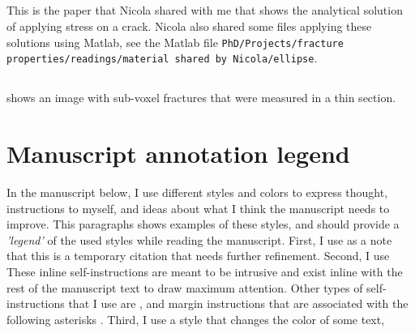 \documentclass[12pt,titlepage]{article}
\begin{document}
\subsection[Maugis (1992)]{\cite{Maugis1992}}
This is the paper that Nicola shared with me that shows the analytical solution of applying stress on a crack. Nicola also shared some files applying these solutions using Matlab, see the Matlab file \texttt{PhD/Projects/fracture properties/readings/material shared by Nicola/ellipse}.
 
\subsection[Ketcham and Carlson (2001)]{\cite{Ketcham2001}} 
\cite[fig. 6]{Ketcham2001} shows an image with sub-voxel fractures that were measured in a thin section.
\clearpage
\newpage



\pagebreak
\appendix
{}
\section*{Manuscript annotation legend}
In the manuscript below, I use different styles and colors to express thought, instructions to myself, and ideas about what I think the manuscript needs to improve. This paragraphs shows examples of these styles, and should provide a \emph{'legend'} of the used styles while reading the manuscript. First, I use  as a note that this is a temporary citation that needs further refinement. Second, I use  These inline self-instructions are meant to be intrusive and exist inline with the rest of the manuscript text to draw maximum attention. Other types of self-instructions that I use are , and margin instructions that are associated with the following asterisks . Third, I use a style that changes the color of some text, 
\end{document}
